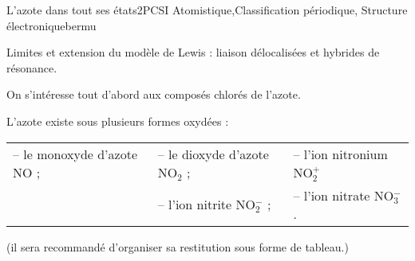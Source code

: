 
\begin{exercise}{L'azote dans tout ses états}{2}{PCSI}
{Atomistique,Classification périodique, Structure électronique}{bermu}


\begin{questions}
    \questioncours Limites et extension du modèle de Lewis : liaison délocalisées et hybrides de résonance.
    

    \question On s'intéresse tout d'abord aux composés chlorés de l'azote.
    
    \question L'azote existe sous plusieurs formes oxydées : \\
    \begin{tabular}{lll}
        -- le monoxyde d'azote NO ; & -- le dioxyde d'azote NO$_2$ ; & -- l'ion nitronium NO$_2^+$ \\
        & -- l'ion nitrite NO$_2^-$ ;  & -- l'ion nitrate NO$_3^-$.
    \end{tabular}
    
    (il sera recommandé d'organiser sa restitution sous forme de tableau.)
\end{questions}
\end{exercise}
